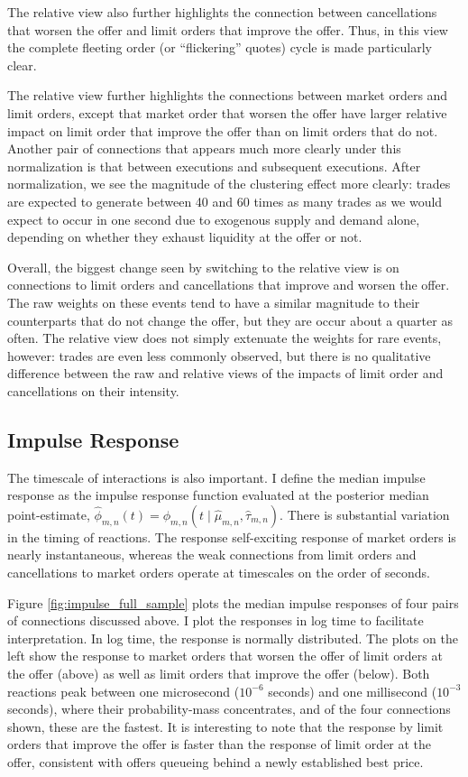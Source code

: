 		The relative view also further highlights the connection between cancellations that worsen the offer and limit orders that improve the offer. Thus, in this view the complete fleeting order (or ``flickering'' quotes) cycle is made particularly clear.

		The relative view further highlights the connections between market orders and limit orders, except that market order that worsen the offer have larger relative impact on limit order that improve the offer than on limit orders that do not. Another pair of connections that appears much more clearly under this normalization is that between executions and subsequent executions. After normalization, we see the magnitude of the clustering effect more clearly: trades are expected to generate between 40 and 60 times as many trades as we would expect to occur in one second due to exogenous supply and demand alone, depending on whether they exhaust liquidity at the offer or not.

		Overall, the biggest change seen by switching to the relative view is on connections to limit orders and cancellations that improve and worsen the offer. The raw weights on these events tend to have a similar magnitude to their counterparts that do not change the offer, but they are occur about a quarter as often. The relative view does not simply extenuate the weights for rare events, however: trades are even less commonly observed, but there is no qualitative difference between the raw and relative views of the impacts of limit order and cancellations on their intensity.

	\subsection{Impulse Response}
		The timescale of interactions is also important. I define the median impulse response as the impulse response function evaluated at the posterior median point-estimate, $\hat{\phi}_{m,n}(t) = \phi_{m,n} \left( t \mid \hat{\mu}_{m,n}, \hat{\tau}_{m,n} \right)$. There is substantial variation in the timing of reactions. The response self-exciting response of market orders is nearly instantaneous, whereas the weak connections from limit orders and cancellations to market orders operate at timescales on the order of seconds.

		Figure \ref{fig:impulse_full_sample} plots the median impulse responses of four pairs of connections discussed above. I plot the responses in log time to facilitate interpretation. In log time, the response is normally distributed. The plots on the left show the response to market orders that worsen the offer of limit orders at the offer (above) as well as limit orders that improve the offer (below). Both reactions peak between one microsecond ($10^{-6}$ seconds) and one millisecond ($10^{-3}$ seconds), where their probability-mass concentrates, and of the four connections shown, these are the fastest. It is interesting to note that the response by limit orders that improve the offer is faster than the response of limit order at the offer, consistent with offers queueing behind a newly established best price.

